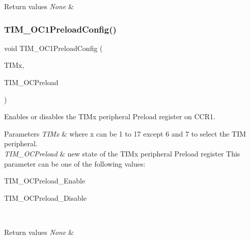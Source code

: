 \begin{DoxyRetVals}{Return values}
{\em None} & \\
\hline
\end{DoxyRetVals}
\mbox{\label{group___t_i_m___exported___functions_ga60e6c29ad8f919bef616cf8e3306dd64}} 
\subsubsection{\texorpdfstring{TIM\_OC1PreloadConfig()}{TIM\_OC1PreloadConfig()}}
{\footnotesize\ttfamily void T\+I\+M\+\_\+\+O\+C1\+Preload\+Config (\begin{DoxyParamCaption}\item[{\mbox{\hyperlink{struct_t_i_m___type_def}{T\+I\+M\+\_\+\+Type\+Def}} $\ast$}]{T\+I\+Mx,  }\item[{uint16\+\_\+t}]{T\+I\+M\+\_\+\+O\+C\+Preload }\end{DoxyParamCaption})}



Enables or disables the T\+I\+Mx peripheral Preload register on C\+C\+R1. 


\begin{DoxyParams}{Parameters}
{\em T\+I\+Mx} & where x can be 1 to 17 except 6 and 7 to select the T\+IM peripheral. \\
\hline
{\em T\+I\+M\+\_\+\+O\+C\+Preload} & new state of the T\+I\+Mx peripheral Preload register This parameter can be one of the following values\+: \begin{DoxyItemize}
\item T\+I\+M\+\_\+\+O\+C\+Preload\+\_\+\+Enable \item T\+I\+M\+\_\+\+O\+C\+Preload\+\_\+\+Disable \end{DoxyItemize}
\\
\hline
\end{DoxyParams}

\begin{DoxyRetVals}{Return values}
{\em None} & \\
\hline
\end{DoxyRetVals}
\mbox{\label{group___t_i_m___exported___functions_ga413359c87f46c69f1ffe2dc8fb3a65e7}} 
